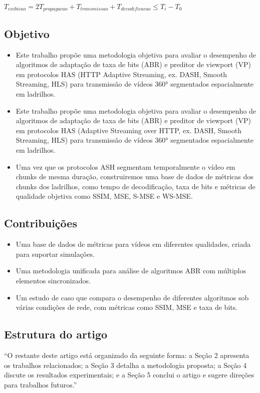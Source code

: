 \begin{math}
	T_{exibicao} = 2T_{propagacao} + T_{transmissao} + T_{decodificacao} \leq T_i - T_0
\end{math}

\subsection{Objetivo}

\begin{itemize}
	\item Este trabalho propõe uma metodologia objetiva para avaliar o desempenho de algoritmos de adaptação de taxa de bits (ABR) e preditor de viewport (VP) em protocolos HAS (HTTP Adaptive Streaming, ex. DASH, Smooth Streaming, HLS) para transmissão de vídeos 360° segmentados espacialmente em ladrilhos.
	\item Este trabalho propõe uma metodologia objetiva para avaliar o desempenho de algoritmos de adaptação de taxa de bits (ABR) e preditor de viewport (VP) em protocolos HAS (Adaptive Streaming over HTTP, ex. DASH, Smooth Streaming, HLS) para transmissão de vídeos 360° segmentados espacialmente em ladrilhos.
	\item Uma vez que os protocolos ASH segmentam temporalmente o vídeo em chunks de mesma duração, construiremos uma base de dados de métricas dos chunks dos ladrilhos, como tempo de decodificação, taxa de bits e métricas de qualidade objetiva como SSIM, MSE, S-MSE e WS-MSE.
\end{itemize}

\subsection{Contribuições}

\begin{itemize}
	\item Uma base de dados de métricas para vídeos em diferentes qualidades, criada para suportar simulações.
	\item Uma metodologia unificada para análise de algoritmos ABR com múltiplos elementos sincronizados.
	\item Um estudo de caso que compara o desempenho de diferentes algoritmos sob várias condições de rede, com métricas como SSIM, MSE e taxa de bits.	
\end{itemize}

\subsection{Estrutura do artigo}

``O restante deste artigo está organizado da seguinte forma: a Seção 2 apresenta os trabalhos relacionados; a Seção 3 detalha a metodologia proposta; a Seção 4 discute os resultados experimentais; e a Seção 5 conclui o artigo e sugere direções para trabalhos futuros.''
